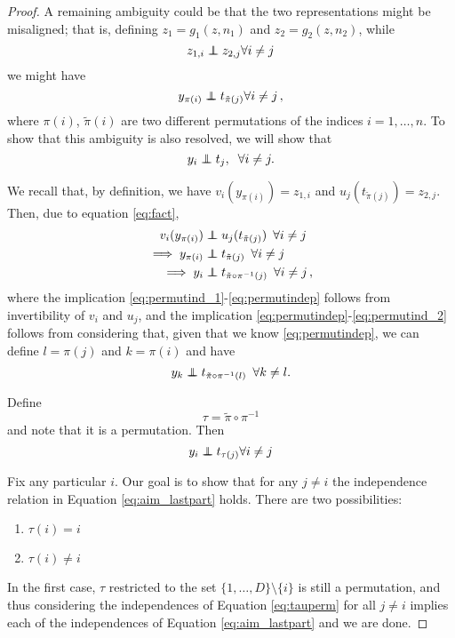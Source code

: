 \begin{proof}
A remaining ambiguity could be that the two representations might be misaligned; that is, defining ${z}_1={g}_1({z}, {n}_1)$ and ${z}_2={g}_2({z}, {n}_2)$, while
	\begin{equation}
	z_{1,i} \independent z_{2,j} \forall i \neq j \label{eq:fact}
	\end{equation}
	we might have
	\[
	y_{\pi(i)} \independent t_{\tilde{\pi}(j)} \forall i \neq j\,,
	\]
	where $\pi(i)$, $\tilde{\pi}(i)$ are two different permutations of the indices $i=1, \ldots, n$. 
To show that this ambiguity is also resolved, we will show that
	\begin{equation}
	y_{i} \independent t_{j},\;\;\forall i \neq j. \label{eq:aim_lastpart}
	\end{equation}
	
	
	We recall that, by definition, we have $v_i(y_{\pi(i)}) = z_{1,i}$ and $u_j(t_{\tilde{\pi}(j)}) = z_{2,j}$. Then, due to equation \ref{eq:fact},
	\begin{align}
	v_i(y_{\pi(i)}) & \independent u_j(t_{\tilde{\pi}(j)}) \,\,\, \forall i \neq j \label{eq:permutind_1}\\
	\implies y_{\pi(i)} & \independent t_{\tilde{\pi}(j)} \,\,\, \forall i \neq j \label{eq:permutindep}\\
	\implies y_{i} & \independent t_{\tilde{\pi}\circ \pi^{-1} (j)} \,\,\, \forall i \neq j\,, \label{eq:permutind_2}
	\end{align}
	where the implication \ref{eq:permutind_1}-\ref{eq:permutindep} follows from invertibility of $v_i$ and $u_j$, and the implication \ref{eq:permutindep}-\ref{eq:permutind_2} follows from considering that, given that we know \ref{eq:permutindep}, we can define $l=\pi(j)$ and $k=\pi(i)$ and have
	\[
	y_{k}  \independent t_{\tilde{\pi} \circ \pi^{-1} (l)} \,\,\, \forall k \neq l.
	\]
	
	Define
	\[
	\tau = \tilde{\pi} \circ \pi^{-1}
	\]
	and note that it is a permutation. Then
	\begin{equation}
	y_i \independent t_{\tau(j)}  \forall i \neq j \label{eq:tauperm}
	\end{equation}
	
	Fix any particular $i$.
	Our goal is to show that for any $j\not= i$ the independence relation in Equation \ref{eq:aim_lastpart} holds.
	There are two possibilities:
	\begin{enumerate}
		\item $\tau(i)=i$
		\item $\tau(i)\neq i$
	\end{enumerate}
	In the first case, $\tau$ restricted to the set $\{1,\ldots,D\}\setminus\{i\}$ is still a permutation, and thus considering the independences of Equation \ref{eq:tauperm} for all $j\not= i$ implies each of the independences of Equation \ref{eq:aim_lastpart} and we are done.
	

\end{proof}
